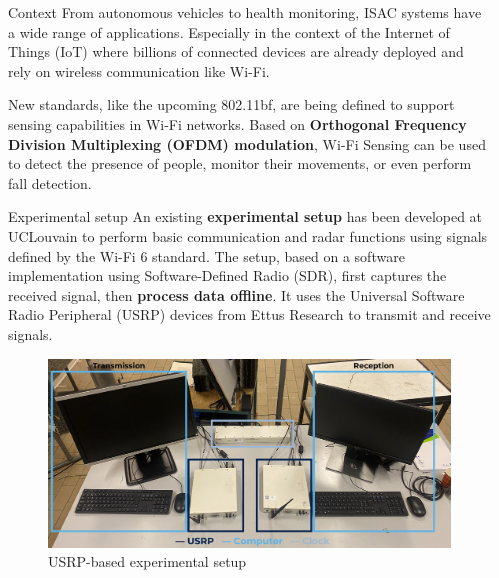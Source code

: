 \documentclass[final]{beamer}
\newlength{\sepwid}
\newlength{\onecolwid}
\begin{document}
\begin{frame}[t,fragile]
\begin{columns}[t]
\begin{column}{\onecolwid}
\begin{block}{Context}
    From autonomous vehicles to health monitoring, ISAC systems have a wide range of applications. Especially in the context of the Internet of Things (IoT) where billions of connected devices are already deployed and rely on wireless communication like Wi-Fi.\newline

    New standards, like the upcoming 802.11bf, are being defined to support sensing capabilities in Wi-Fi networks. Based on \textbf{Orthogonal Frequency Division Multiplexing (OFDM) modulation}, Wi-Fi Sensing can be used to detect the presence of people, monitor their movements, or even perform fall detection.
  \end{block}


  \begin{block}{Experimental setup}
    An existing \textbf{experimental setup} has been developed at UCLouvain to perform basic communication and radar functions using signals defined by the Wi-Fi 6 standard. The setup, based on a software implementation using Software-Defined Radio (SDR), first captures the received signal, then \textbf{process data offline}. It uses the Universal Software Radio Peripheral (USRP) devices from Ettus Research to transmit and receive signals.

    \vspace{0.5in}

    \begin{figure}[!ht]
      \centering
      \includegraphics[width=\linewidth]{img/setup.pdf}
      \caption{USRP-based experimental setup}
    \end{figure}
  \end{block}

\end{column}

\begin{column}{\sepwid}\end{column} %


\end{columns}
\end{frame}
\end{document}
